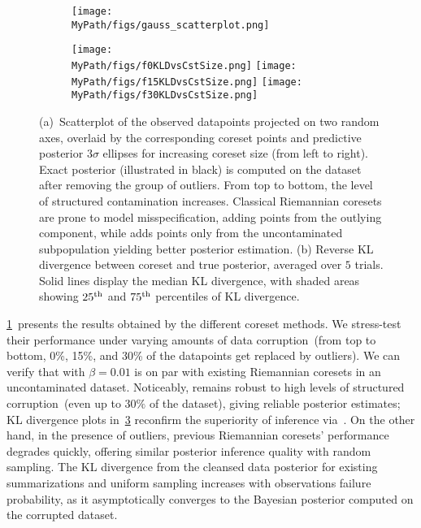 \begin{figure}[!ht]
	\centering 
	\begin{subfigure}[b]{0.9\textwidth} 
		\texttt{[image: \\MyPath/figs/gauss\_scatterplot.png]}
		\caption{\label{fig:beta_gaussian_coreset_points}}
	\end{subfigure}
	\hfill\qquad
	\begin{subfigure}[b]{0.9\textwidth} 
		\centering
		\texttt{[image: \\MyPath/figs/f0KLDvsCstSize.png]}
		\centering
		\hfill
		\texttt{[image: \\MyPath/figs/f15KLDvsCstSize.png]}
		\centering
		\hfill
		\texttt{[image: \\MyPath/figs/f30KLDvsCstSize.png]}
		\caption{\label{fig:gauss_kld}}
	\end{subfigure}	
	\centering
	\caption{(a)~Scatterplot of the observed datapoints projected on two random axes, overlaid by the corresponding coreset points and predictive posterior $3\sigma$ ellipses for increasing coreset size (from left to right). Exact posterior (illustrated in black) is computed on the dataset after removing the group of outliers. From top to bottom, the level of structured contamination increases. Classical Riemannian coresets are prone to model misspecification, adding points from the outlying component, while \bcores{} adds points only from the uncontaminated subpopulation yielding better posterior estimation. (b) Reverse KL divergence between coreset and true posterior, averaged over $5$ trials. Solid lines display the median KL divergence, with shaded areas showing $25\textsuperscript{th}$ and $75\textsuperscript{th}$ percentiles of KL divergence.}
\end{figure}


\cref{fig:beta_gaussian_coreset_points}~presents the results obtained by the different coreset methods. We stress-test their performance under varying amounts of data corruption~(from top to bottom, 0\%, 15\%, and 30\% of the datapoints get replaced by outliers). We can verify that \bcores{} with $\beta=0.01$ is on par with existing Riemannian coresets in an uncontaminated dataset. Noticeably, \bcores{} remains robust to high levels of structured corruption~(even up to $30\%$ of the dataset), giving reliable posterior estimates; KL divergence plots in~\cref{fig:gauss_kld} reconfirm the superiority of inference via~\bcores{}. On the other hand, in the presence of outliers, previous Riemannian coresets' performance degrades quickly, offering similar posterior inference quality with random sampling. The KL divergence from the cleansed data posterior for existing summarizations and uniform sampling increases with observations failure probability, as it asymptotically converges to the Bayesian posterior computed on the corrupted dataset. 

